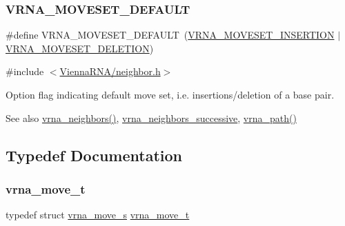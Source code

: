 \subsubsection{\texorpdfstring{V\+R\+N\+A\+\_\+\+M\+O\+V\+E\+S\+E\+T\+\_\+\+D\+E\+F\+A\+U\+LT}{VRNA\_MOVESET\_DEFAULT}}
{\footnotesize\ttfamily \#define V\+R\+N\+A\+\_\+\+M\+O\+V\+E\+S\+E\+T\+\_\+\+D\+E\+F\+A\+U\+LT~(\mbox{\hyperlink{group__neighbors_gaf39028db9c70d3be528929182a3f2d5a}{V\+R\+N\+A\+\_\+\+M\+O\+V\+E\+S\+E\+T\+\_\+\+I\+N\+S\+E\+R\+T\+I\+ON}} $\vert$ \mbox{\hyperlink{group__neighbors_gac05db9392c6647e3e9a6982096c5b384}{V\+R\+N\+A\+\_\+\+M\+O\+V\+E\+S\+E\+T\+\_\+\+D\+E\+L\+E\+T\+I\+ON}})}



{\ttfamily \#include $<$\mbox{\hyperlink{neighbor_8h}{Vienna\+R\+N\+A/neighbor.\+h}}$>$}



Option flag indicating default move set, i.\+e. insertions/deletion of a base pair. 

\begin{DoxySeeAlso}{See also}
\mbox{\hyperlink{group__neighbors_gab1473d856b15da2120fe648977798ad5}{vrna\+\_\+neighbors()}}, \mbox{\hyperlink{group__neighbors_gae5aaa1c5a1f22e889843f3edbdd04714}{vrna\+\_\+neighbors\+\_\+successive}}, \mbox{\hyperlink{group__paths_gab6aee4143f8b103518d5cbfe6bfe5eae}{vrna\+\_\+path()}} 
\end{DoxySeeAlso}


\subsection{Typedef Documentation}
\mbox{\label{group__neighbors_ga08630e00206cd163ea29c462bf5f4755}} 
\subsubsection{\texorpdfstring{vrna\+\_\+move\+\_\+t}{vrna\_move\_t}}
{\footnotesize\ttfamily typedef struct \mbox{\hyperlink{group__neighbors_structvrna__move__s}{vrna\+\_\+move\+\_\+s}} \mbox{\hyperlink{group__neighbors_ga08630e00206cd163ea29c462bf5f4755}{vrna\+\_\+move\+\_\+t}}}



